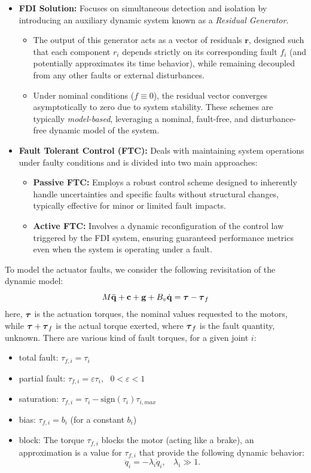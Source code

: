 \documentclass[10pt, a4paper]{report}
\begin{document}
\begin{itemize}
    \item \textbf{FDI Solution:} Focuses on simultaneous detection and isolation by introducing an auxiliary dynamic system known as a \textit{Residual Generator}. 
    \begin{itemize}
        \item The output of this generator acts as a vector of residuals $\mathbf r$, designed such that each component $r_i$ depends strictly on its corresponding fault $f_i$ (and potentially approximates its time behavior), while remaining decoupled from any other faults or external disturbances.
        \item Under nominal conditions ($f \equiv 0$), the residual vector converges asymptotically to zero due to system stability. These schemes are typically \textit{model-based}, leveraging a nominal, fault-free, and disturbance-free dynamic model of the system.
    \end{itemize}
    \item \textbf{Fault Tolerant Control (FTC):} Deals with maintaining system operations under faulty conditions and is divided into two main approaches:
    \begin{itemize}
        \item \textbf{Passive FTC:} Employs a robust control scheme designed to inherently handle uncertainties and specific faults without structural changes, typically effective for minor or limited fault impacts.
        \item \textbf{Active FTC:} Involves a dynamic reconfiguration of the control law triggered by the FDI system, ensuring guaranteed performance metrics even when the system is operating under a fault.
    \end{itemize}
\end{itemize}
To model the actuator faults, we consider the following revisitation of the dynamic model:\begin{equation}
    M{\ddot{\mathbf q}}+\mathbf c+\mathbf g+B_v{\dot{\mathbf q}}={\boldsymbol{\tau}}-{\boldsymbol{\tau}}_f 
\end{equation}
here, ${\boldsymbol{\tau}}$ is the actuation torques, the nominal values requested to the motors, while ${\boldsymbol{\tau}}+{\boldsymbol{\tau}}_f$ is the actual torque exerted, where ${\boldsymbol{\tau}}_f$ is the fault quantity, unknown. There are various kind of fault torques, for a given joint $i$:\begin{itemize}
    \item total fault: $\tau_{f,i}=\tau_i$ 
    \item partial fault: $\tau_{f,i}=\varepsilon\tau_i, \ \ \ 0<\varepsilon<1$
    \item saturation: $\tau_{f,i}=\tau_i-\text{sign}(\tau_i)\tau_{i,max}$
    \item bias: $\tau_{f,i}=b_i$ (for a constant $b_i$)
    \item block: The torque $\tau_{f,i}$ blocks the motor (acting like a brake), an approximation is a value for  $\tau_{f,i}$ that provide the following dynamic behavior:\begin{equation}
        \ddot q_i=-\lambda_i\dot q_i, \ \ \ \ \lambda_i\gg 1.
    \end{equation}
\end{itemize}
\end{document}
